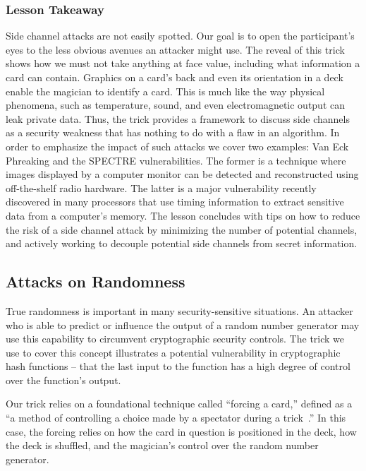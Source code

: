 \subsubsection{Lesson Takeaway}

Side channel attacks are not easily spotted.  Our goal is to
open the participant's eyes to the less
obvious avenues an attacker might use.
The reveal of this trick shows how we must not
take anything at face value, including what information
a card can contain.
Graphics on a card's back and even its orientation in a
deck enable the magician to identify a card. This is much like the way physical phenomena,
such as temperature, sound, and even electromagnetic output can
leak private data.
Thus, the trick provides a framework
to discuss side channels
as a security weakness that has nothing to do with a flaw in an
algorithm.
In order to emphasize the impact of such attacks we cover two examples: Van
Eck Phreaking and the SPECTRE vulnerabilities.
The former is a technique where images displayed by a computer monitor can be
detected and reconstructed using off-the-shelf radio hardware.
The latter is a major vulnerability recently discovered in many 
processors that use timing information to extract sensitive data from a
computer's memory.
The lesson concludes with tips on how to
reduce the risk of a side channel attack
by minimizing the number of potential channels,
and actively working to decouple potential
side channels from secret information.

\subsection{Attacks on Randomness}


True randomness is important in many
security-sensitive situations.
An attacker who is able to predict or influence the output of a random number
generator may use this capability to circumvent cryptographic security controls.
The trick we use to cover this concept
illustrates a potential vulnerability in cryptographic hash functions
-- that the last input to the function has a high degree of control over
the function's output.

Our trick relies on a foundational technique called ``forcing a card,''
defined as a ``a method of controlling a choice made by a spectator during
a trick~\cite{forcingcard}.''
In this case, the forcing relies on how the card in question is positioned
in the deck, how the deck is shuffled, and the magician's control over the
random number generator.

